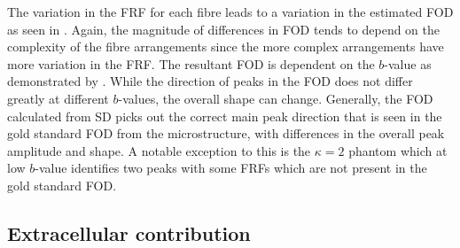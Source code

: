 The variation in the \ac{FRF} for each fibre leads to a variation in the estimated \ac{FOD} as seen in .
Again, the magnitude of differences in \ac{FOD} tends to depend on the complexity of the fibre arrangements since the more complex arrangements have more variation in the \ac{FRF}.
The resultant \ac{FOD} is dependent on the $b$-value as demonstrated by . While the direction of peaks in the \ac{FOD} does not differ greatly at different $b$-values, the overall shape can change. 
Generally, the \ac{FOD} calculated from \ac{SD} picks out the correct main peak direction that is seen in the gold standard \ac{FOD} from the microstructure, with differences in the overall peak amplitude and shape.
A notable exception to this is the $\kappa=2$ phantom which at low $b$-value identifies two peaks with some \acp{FRF} which are not present in the gold standard \ac{FOD}.

\subsection{Extracellular contribution}
\label{sec:frf_res_extracellular}


